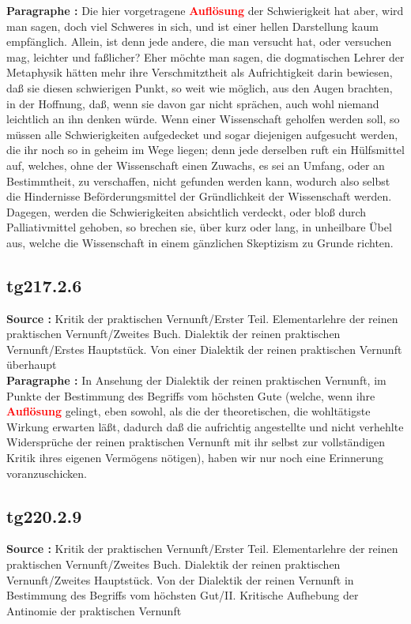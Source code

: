 \documentclass[a4paper,12pt,twoside]{book}
\newcommand{\match}[1]{\textcolor{red}{\textbf{#1}}}
\begin{document}
	\noindent\textbf{Paragraphe : }Die hier vorgetragene \match{Auflösung} der Schwierigkeit hat aber, wird man sagen, doch viel Schweres in sich, und ist einer hellen Darstellung kaum empfänglich. Allein, ist denn jede andere, die man versucht hat, oder versuchen mag, leichter und faßlicher? Eher möchte man sagen, die dogmatischen Lehrer der Metaphysik hätten mehr ihre Verschmitztheit als Aufrichtigkeit darin bewiesen, daß sie diesen schwierigen Punkt, so weit wie möglich, aus den Augen brachten, in der Hoffnung, daß, wenn sie davon gar nicht sprächen, auch wohl niemand leichtlich an ihn denken würde. Wenn einer Wissenschaft geholfen werden soll, so müssen alle Schwierigkeiten aufgedecket und sogar diejenigen aufgesucht werden, die ihr noch so in geheim im Wege liegen; denn jede derselben ruft ein Hülfsmittel auf, welches, ohne der Wissenschaft einen Zuwachs, es sei an Umfang,  oder an Bestimmtheit, zu verschaffen, nicht gefunden werden kann, wodurch also selbst die Hindernisse Beförderungsmittel der Gründlichkeit der Wissenschaft werden. Dagegen, werden die Schwierigkeiten absichtlich verdeckt, oder bloß durch Palliativmittel gehoben, so brechen sie, über kurz oder lang, in unheilbare Übel aus, welche die Wissenschaft in einem gänzlichen Skeptizism zu Grunde richten. 
	
	\subsection*{tg217.2.6} 
	\textbf{Source : }Kritik der praktischen Vernunft/Erster Teil. Elementarlehre der reinen praktischen Vernunft/Zweites Buch. Dialektik der reinen praktischen Vernunft/Erstes Hauptstück. Von einer Dialektik der reinen praktischen Vernunft überhaupt\\  
	
	\noindent\textbf{Paragraphe : }In Ansehung der Dialektik der reinen praktischen Vernunft, im Punkte der Bestimmung des Begriffs vom höchsten Gute (welche, wenn ihre \match{Auflösung} gelingt, eben sowohl, als die der theoretischen, die wohltätigste Wirkung erwarten läßt, dadurch daß die aufrichtig angestellte und nicht verhehlte Widersprüche der reinen praktischen Vernunft mit ihr selbst zur vollständigen Kritik ihres eigenen Vermögens nötigen), haben wir nur noch eine Erinnerung voranzuschicken. 
	
	\subsection*{tg220.2.9} 
	\textbf{Source : }Kritik der praktischen Vernunft/Erster Teil. Elementarlehre der reinen praktischen Vernunft/Zweites Buch. Dialektik der reinen praktischen Vernunft/Zweites Hauptstück. Von der Dialektik der reinen Vernunft in Bestimmung des Begriffs vom höchsten Gut/II. Kritische Aufhebung der Antinomie der praktischen Vernunft\\  
	
\end{document}
